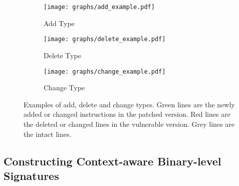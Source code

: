 \begin{figure}[!t]
\begin{subfigure}[b]{0.5\textwidth}
         \centering
         \texttt{[image: graphs/add\_example.pdf]}
         \caption{Add Type}
         \label{fig:add_example}
\end{subfigure}

\begin{subfigure}[b]{0.5\textwidth}
         \centering
         \texttt{[image: graphs/delete\_example.pdf]}
         \caption{Delete Type}
         \label{fig:delete_example}
\end{subfigure}

\begin{subfigure}[b]{0.5\textwidth}
         \centering
         \texttt{[image: graphs/change\_example.pdf]}
         \caption{Change Type}
         \label{fig:change_example}
\end{subfigure}

\caption{Examples of add, delete and change types. Green lines are the newly added or changed instructions in the patched version. Red lines are the deleted or changed lines in the vulnerable version. Grey lines are the intact lines. }%
\label{fig:addExample}
\end{figure}



\subsection{Constructing Context-aware Binary-level Signatures}
\label{sec:form}

